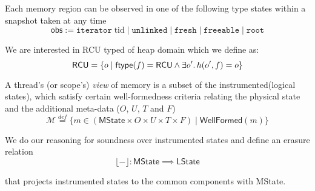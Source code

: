 Each memory region can be observed in one of the following type states within a snapshot taken at any time
\[\textsf{obs} := \texttt{iterator} \; \mathrm{tid} \mid \texttt{unlinked} \mid \texttt{fresh} \mid \texttt{freeable} \mid \texttt{root}\]

We are interested in \textsf{RCU} typed of heap domain which we define as:
\[\textsf{RCU} = \{ o \mid \textsf{ftype}(f) = \textsf{RCU} \land \exists o' \ldotp h(o',f) = o \}\]

A thread's (or scope's) \emph{view} of memory is a subset of the instrumented(logical states), which satisfy certain well-formedness criteria relating the physical state and the additional meta-data ($O$, $U$, $T$ and $F$)
\[\mathcal{M} \stackrel{def}{=} \{ m \in (\textsf{MState} \times O \times U \times T \times F) \mid  \textsf{WellFormed}(m) \} \]

We do our reasoning for soundness over instrumented states and define an erasure relation
\[\lfloor - \rfloor :\mathsf{MState} \implies \textsf{LState}\]

that projects instrumented states to the common components with \textsf{MState}.


